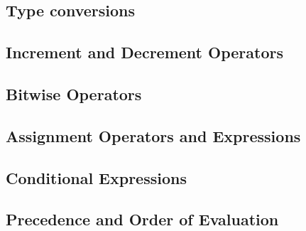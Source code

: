 \documentclass{article}
\begin{document}
\subsection{Type conversions}

\subsection{Increment and Decrement Operators}

\subsection{Bitwise Operators}

\subsection{Assignment Operators and Expressions}

\subsection{Conditional Expressions}

\subsection{Precedence and Order of Evaluation}
\end{document}
